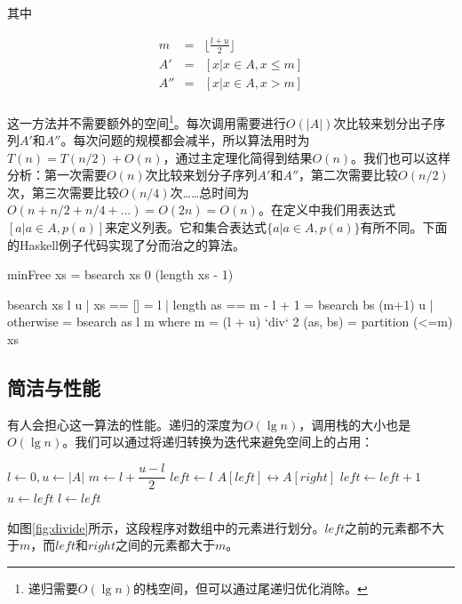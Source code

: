 \documentclass[b5paper]{ctexart}
\begin{document}
其中

\[ \begin{array}{rcl}
m & = & \displaystyle \lfloor \frac{l+u}{2} \rfloor \\
A' & = & [ x | x \in A, x \leq m ] \\
A''& = & [ x | x \in A, x > m ] \\
\end{array} \]

这一方法并不需要额外的空间\footnote{递归需要$O(\lg n)$的栈空间，但可以通过尾递归优化消除。}。每次调用需要进行$O(|A|)$次比较来划分出子序列$A'$和$A''$。每次问题的规模都会减半，所以算法用时为$T(n) = T(n/2) + O(n)$，通过主定理化简得到结果$O(n)$。我们也可以这样分析：第一次需要$O(n)$次比较来划分子序列$A'$和$A''$，第二次需要比较$O(n/2)$次，第三次需要比较$O(n/4)$次……总时间为$O(n + n/2 + n/4 + ...) = O(2n) = O(n)$。在定义中我们用表达式$[a | a \in A, p(a)]$来定义列表。它和集合表达式$\{a | a \in A, p(a) \}$有所不同。下面的Haskell例子代码实现了分而治之的算法。

\begin{Haskell}
minFree xs = bsearch xs 0 (length xs - 1)

bsearch xs l u | xs == [] = l
               | length as == m - l + 1 = bsearch bs (m+1) u
               | otherwise = bsearch as l m
    where
      m = (l + u) `div` 2
      (as, bs) = partition (<=m) xs
\end{Haskell}

\subsection*{简洁与性能}
有人会担心这一算法的性能。递归的深度为$O(\lg n)$，调用栈的大小也是$O(\lg n)$。我们可以通过将递归转换为迭代来避免空间上的占用：

\begin{algorithmic}[1]
  \State $l \gets 0, u \gets |A|$
    \State $m \gets l + \dfrac{u - l}{2}$
    \State $left \gets l$
        \State $A[left] \leftrightarrow A[right]$
        \State $left \gets left + 1$
      \EndIf
    \EndFor
      \State $u \gets left$
    \Else
      \State $l \gets left$
    \EndIf
  \EndWhile
\EndFunction
\end{algorithmic}

如图\ref{fig:divide}所示，这段程序对数组中的元素进行划分。$left$之前的元素都不大于$m$，而$left$和$right$之间的元素都大于$m$。
\end{document}
